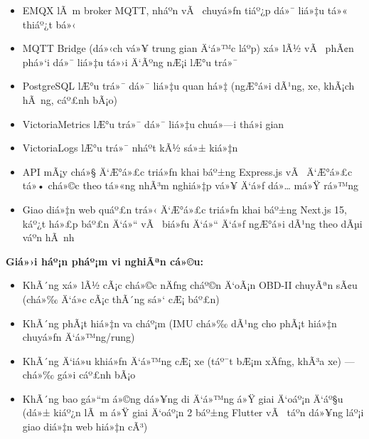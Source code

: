 \documentclass[a4paper]{extarticle}
\providecommand{\tightlist}{%
  \setlength{\itemsep}{0pt}\setlength{\parskip}{0pt}}
\begin{document}
\begin{itemize}
\tightlist
\item
  EMQX lÃ m broker MQTT, nháº­n vÃ  chuyá»ƒn tiáº¿p dá»¯ liá»‡u tá»« thiáº¿t bá»‹
\item
  MQTT Bridge (dá»‹ch vá»¥ trung gian Ä‘á»™c láº­p) xá»­ lÃ½ vÃ  phÃ¢n phá»‘i dá»¯ liá»‡u tá»›i
  Ä‘Ãºng nÆ¡i lÆ°u trá»¯
\item
  PostgreSQL lÆ°u trá»¯ dá»¯ liá»‡u quan há»‡ (ngÆ°á»i dÃ¹ng, xe, khÃ¡ch hÃ ng, cáº£nh
  bÃ¡o)
\item
  VictoriaMetrics lÆ°u trá»¯ dá»¯ liá»‡u chuá»—i thá»i gian
\item
  VictoriaLogs lÆ°u trá»¯ nháº­t kÃ½ sá»± kiá»‡n
\item
  API mÃ¡y chá»§ Ä‘Æ°á»£c triá»ƒn khai báº±ng Express.js vÃ  Ä‘Æ°á»£c tá»• chá»©c theo tá»«ng
  nhÃ³m nghiá»‡p vá»¥ Ä‘á»ƒ dá»… má»Ÿ rá»™ng
\item
  Giao diá»‡n web quáº£n trá»‹ Ä‘Æ°á»£c triá»ƒn khai báº±ng Next.js 15, káº¿t há»£p báº£n Ä‘á»“
  vÃ  biá»ƒu Ä‘á»“ Ä‘á»ƒ ngÆ°á»i dÃ¹ng theo dÃµi váº­n hÃ nh
\end{itemize}

\textbf{Giá»›i háº¡n pháº¡m vi nghiÃªn cá»©u:}

\begin{itemize}
\tightlist
\item
  KhÃ´ng xá»­ lÃ½ cÃ¡c chá»©c nÄƒng cháº©n Ä‘oÃ¡n OBD-II chuyÃªn sÃ¢u (chá»‰ Ä‘á»c cÃ¡c
  thÃ´ng sá»‘ cÆ¡ báº£n)
\item
  KhÃ´ng phÃ¡t hiá»‡n va cháº¡m (IMU chá»‰ dÃ¹ng cho phÃ¡t hiá»‡n chuyá»ƒn Ä‘á»™ng/rung)
\item
  KhÃ´ng Ä‘iá»u khiá»ƒn Ä‘á»™ng cÆ¡ xe (táº¯t bÆ¡m xÄƒng, khÃ³a xe) --- chá»‰ gá»­i cáº£nh
  bÃ¡o
\item
  KhÃ´ng bao gá»“m á»©ng dá»¥ng di Ä‘á»™ng á»Ÿ giai Ä‘oáº¡n Ä‘áº§u (dá»± kiáº¿n lÃ m á»Ÿ giai
  Ä‘oáº¡n 2 báº±ng Flutter vÃ  táº­n dá»¥ng láº¡i giao diá»‡n web hiá»‡n cÃ³)
\end{itemize}
\end{document}
